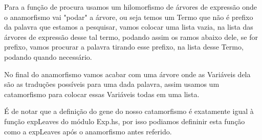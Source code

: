 \documentclass[a4paper]{article}
\begin{document}
\par Para a função de procura usamos um hilomorfismo de árvores de expressão
onde o anamorfismo vai "podar" a árvore, ou seja temos um Termo que não é
prefixo da palavra que estamos a pesquisar, vamos colocar uma lista vazia, 
na lista das árvores de expressão desse tal termo, podando assim os ramos abaixo 
dele, se for prefixo, vamos procurar a palavra tirando esse prefixo, na lista 
desse Termo, podando quando necessário.
\\
\par No final do anamorfismo vamos acabar com uma árvore onde as Variáveis dela
são as traduções possíveis para uma dada palavra, assim usamos um catamorfismo
para colocar essas Variáveis todas em uma lista.
\\
\par É de notar que a definição do gene do nosso catamorfismo é exatamente igual
à função expLeaves do módulo Exp.hs, por isso podiamos defininir esta função
como a expLeaves após o anamorfismo antes referido.
\end{document}
